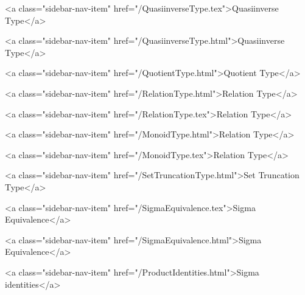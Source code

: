       
    
      
        
          <a class="sidebar-nav-item" href="/QuasiinverseType.tex">Quasiinverse Type</a>
        
      
    
      
        
          <a class="sidebar-nav-item" href="/QuasiinverseType.html">Quasiinverse Type</a>
        
      
    
      
        
          <a class="sidebar-nav-item" href="/QuotientType.html">Quotient Type</a>
        
      
    
      
        
          <a class="sidebar-nav-item" href="/RelationType.html">Relation Type</a>
        
      
    
      
        
          <a class="sidebar-nav-item" href="/RelationType.tex">Relation Type</a>
        
      
    
      
        
          <a class="sidebar-nav-item" href="/MonoidType.html">Relation Type</a>
        
      
    
      
        
          <a class="sidebar-nav-item" href="/MonoidType.tex">Relation Type</a>
        
      
    
      
        
          <a class="sidebar-nav-item" href="/SetTruncationType.html">Set Truncation Type</a>
        
      
    
      
        
          <a class="sidebar-nav-item" href="/SigmaEquivalence.tex">Sigma Equivalence</a>
        
      
    
      
        
          <a class="sidebar-nav-item" href="/SigmaEquivalence.html">Sigma Equivalence</a>
        
      
    
      
        
          <a class="sidebar-nav-item" href="/ProductIdentities.html">Sigma identities</a>
        
